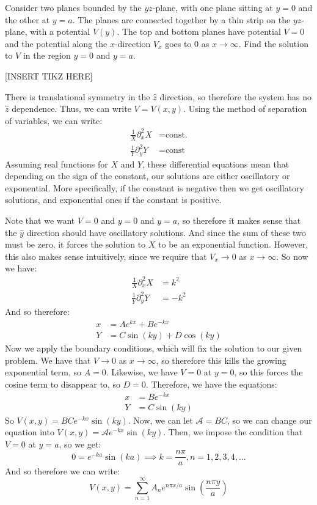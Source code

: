 \begin{example}{}{}
	Consider two planes bounded by the $yz$-plane, with one plane sitting at $y=0$ and the other at $y=a$. The
	planes are connected together by a thin strip on the $yz$-plane, with a potential $V(y)$. The top and bottom
	planes have potential $V = 0$ and the potential along the $x$-direction $V_x$ goes to 0 as $x\to\infty$. Find 
	the solution to $V$ in the region $y=0$ and $y=a$. 

	[INSERT TIKZ HERE]
	
	There is translational symmetry in the $\hat{z}$ direction, so therefore the system has no $\hat{z}$ 
	dependence. Thus, we can write $V = V(x, y)$. Using the method of separation of variables, we can write:
	\begin{align*}
			\frac{1}{X}\partial_x^2 X &= \text{const.}\\
			\frac{1}{Y}\partial_y^2	Y &= \text{const}
	\end{align*}
	Assuming real functions for $X$ and $Y$, these differential equations mean that depending on the sign of the 
	constant, our solutions are either oscillatory or exponential. More specifically, if the constant is negative
	then we get oscillatory solutions, and exponential ones if the constant is positive. 

	Note that we want $V = 0$ and $y = 0$ and $y = a$, so therefore it makes sense that the $\hat{y}$ direction 
	should have oscillatory solutions. And since the sum of these two must be zero, it forces the solution to $X$
	to be an exponential function. However, this also makes sense intuitively, since we require that $V_x \to 0$ 
	as $x \to \infty$. So now we have:
	\begin{align*}
			\frac{1}{X}\partial_x^2 X &= k^2\\
			\frac{1}{Y}\partial_y^2 Y &= -k^2
	\end{align*}
	And so therefore:
	\begin{align*}
			x &= Ae^{kx} + Be^{-kx}\\
			Y &= C \sin (ky) + D \cos(ky)
	\end{align*}
	Now we apply the boundary conditions, which will fix the solution to our given problem. We have that $V \to 0$
	as $x \to \infty$, so therefore this kills the growing exponential term, so $A = 0$. Likewise, we have $V =0$
	at $y = 0$, so this forces the cosine term to disappear to, so $D = 0$. Therefore, we have the equations:
	\begin{align*}
			x &= Be^{-kx}\\
			Y &= C\sin(ky)
	\end{align*}
	So $V(x, y) = BCe^{-kx}\sin(ky)$. Now, we can let $\mathcal A = BC$, so we can change our equation into 
	$V(x, y) = \mathcal A e^{-kx} \sin(ky)$. Then, we impose the condition that $V = 0$ at $y = a$, so we get:
	\[0 = e^{-ka}\sin(ka) \implies  k = \frac{n\pi}{a}, n = 1, 2, 3, 4, \dots\]
	And so therefore we can write:
	\[ V(x, y) = \sum_{n = 1}^\infty A_n e^{n\pi x/a} \sin\left( \frac{n\pi y}{a} \right) \]




	
\end{example}




